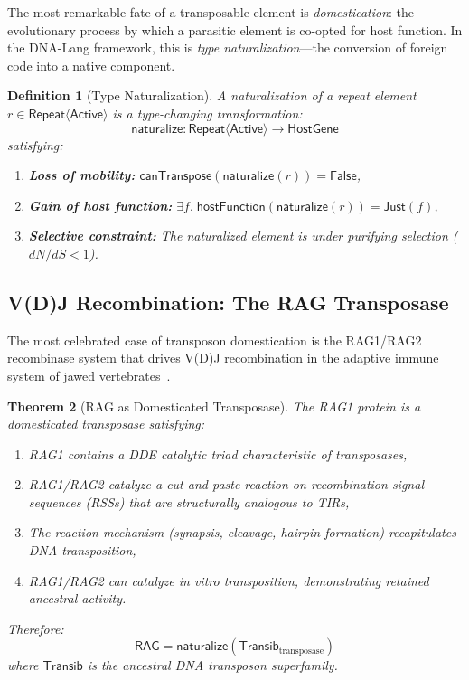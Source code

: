\documentclass[12pt,a4paper]{article}
\newtheorem{theorem}{Theorem}[section]
\newtheorem{definition}[theorem]{Definition}
\newcommand{\Repeat}{\mathsf{Repeat}}
\begin{document}
The most remarkable fate of a transposable element is \emph{domestication}: the
evolutionary process by which a parasitic element is co-opted for host function.
In the DNA-Lang framework, this is \emph{type naturalization}---the conversion of
foreign code into a native component.

\begin{definition}[Type Naturalization]\label{def:naturalization}
A \emph{naturalization} of a repeat element $r \in \Repeat\langle\mathsf{Active}\rangle$
is a type-changing transformation:
\[
  \mathsf{naturalize} : \Repeat\langle\mathsf{Active}\rangle \to \mathsf{HostGene}
\]
satisfying:
\begin{enumerate}[label=(\roman*)]
  \item \textbf{Loss of mobility:} $\mathsf{canTranspose}(\mathsf{naturalize}(r)) = \mathsf{False}$,
  \item \textbf{Gain of host function:} $\exists f.\; \mathsf{hostFunction}(\mathsf{naturalize}(r)) = \mathsf{Just}(f)$,
  \item \textbf{Selective constraint:} The naturalized element is under purifying selection
    ($dN/dS < 1$).
\end{enumerate}
\end{definition}

\subsection{V(D)J Recombination: The RAG Transposase}

The most celebrated case of transposon domestication is the RAG1/RAG2 recombinase
system that drives V(D)J recombination in the adaptive immune system of jawed
vertebrates~\cite{agrawal1998,hiom1998}.

\begin{theorem}[RAG as Domesticated Transposase]\label{thm:rag}
The RAG1 protein is a domesticated transposase satisfying:
\begin{enumerate}[label=(\roman*)]
  \item RAG1 contains a DDE catalytic triad characteristic of transposases,
  \item RAG1/RAG2 catalyze a cut-and-paste reaction on recombination signal
    sequences (RSSs) that are structurally analogous to TIRs,
  \item The reaction mechanism (synapsis, cleavage, hairpin formation) recapitulates
    DNA transposition,
  \item RAG1/RAG2 can catalyze \emph{in vitro} transposition, demonstrating retained
    ancestral activity.
\end{enumerate}
Therefore:
\[
  \mathsf{RAG} = \mathsf{naturalize}(\mathsf{Transib}_{\mathrm{transposase}})
\]
where $\mathsf{Transib}$ is the ancestral DNA transposon superfamily.
\end{theorem}
\end{document}
